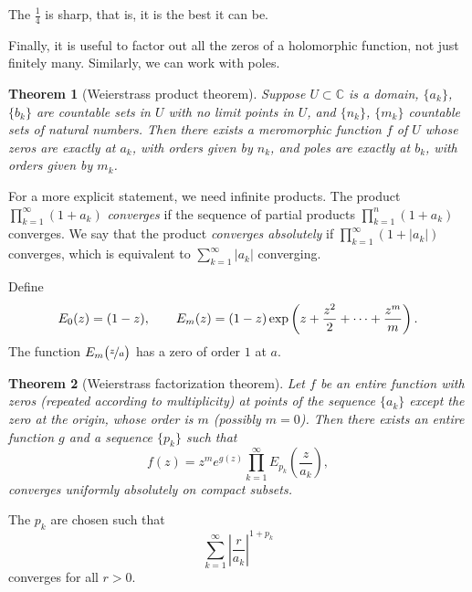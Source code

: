 \documentclass[12pt,openany]{book}
\newcommand{\avoidbreak}{\postdisplaypenalty=100}
\newcommand{\sabs}[1]{\lvert {#1} \rvert}
\newcommand{\abs}[1]{\left\lvert {#1} \right\rvert}
\newcommand{\C}{{\mathbb{C}}}
\theoremstyle{plain}
\newtheorem{thm}{Theorem}[section]
\theoremstyle{remark}
\theoremstyle{definition}
\theoremstyle{exercise}
\theoremstyle{example}
\begin{document}
The $\frac{1}{4}$ is sharp, that is, it is the best it can be.

\medskip

Finally, it is useful to factor out all the zeros of a holomorphic function,
not just finitely many.  Similarly, we can work with poles.

\begin{thm}[Weierstrass product theorem]
Suppose $U \subset \C$ is a domain, $\{ a_k \}$, $\{ b_k \}$ are
countable sets in $U$
with no limit points in $U$, and $\{ n_k \}$, $\{ m_k \}$ countable sets of
natural numbers.
Then there exists a meromorphic function $f$ of $U$ whose
zeros are exactly at $a_k$, with orders given by $n_k$, and
poles are exactly at $b_k$, with orders given by $m_k$.
\end{thm}

For a more explicit statement, we need infinite products.  The product
$\prod_{k=1}^\infty (1+a_k)$
\emph{converges} if the sequence of partial products
$\prod_{k=1}^n (1+a_k)$ converges.  We say that the product
\emph{converges absolutely} if
$\prod_{k=1}^\infty (1+\sabs{a_k})$
converges, which is equivalent to $\sum_{k=1}^\infty \sabs{a_k}$ converging.

Define
\begin{equation*}
E_0(z) = (1-z), \qquad
E_m(z) = (1-z) \exp\left( z +\frac{z^2}{2} + \cdots + \frac{z^m}{m} \right)
.
\avoidbreak
\end{equation*}
The function $E_m\bigl(\nicefrac{z}{a}\bigr)$ has a zero of order $1$ at $a$.

\begin{thm}[Weierstrass factorization theorem]
Let $f$ be an entire function with zeros (repeated according to multiplicity) at points of
the sequence $\{ a_k \}$ except the zero at
the origin, whose order is $m$ (possibly $m=0$).  Then there exists an
entire function $g$ and a sequence $\{ p_k \}$ such that
\begin{equation*}
f(z) = z^m e^{g(z)} \prod_{k=1}^\infty E_{p_k}\left(\frac{z}{a_k}\right) ,
\end{equation*}
converges uniformly absolutely on compact subsets.
\end{thm}

The $p_k$ are chosen such that
\begin{equation*}
\sum_{k=1}^\infty {\abs{\frac{r}{a_k}}}^{1+p_k}
\end{equation*}
converges for all $r > 0$.
\end{document}
